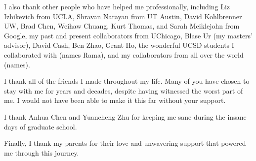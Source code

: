 \documentclass[12pt]{ucsddissertation}
\begin{document}
\begin{acknowledgements}
I also thank other people who have helped me professionally, including Liz Izhikevich from UCLA, Shravan Narayan from UT Austin, David Kohlbrenner UW, Brad Chen, Weihaw Chuang, Kurt Thomas, and Sarah Meiklejohn from Google, my past and present collaborators from UChicago, Blase Ur (my masters' advisor), David Cash, Ben Zhao, Grant Ho, the wonderful UCSD students I collaborated with (names Rama), and my collaborators from all over the world (names).

I thank all of the friends I made throughout my life. Many of you have chosen to stay with me for years and decades, despite having witnessed the worst part of me. I would not have been able to make it this far without your support. 

I thank Anhua Chen and Yuancheng Zhu for keeping me sane during the insane days of graduate school.

Finally, I thank my parents for their love and unwavering support that powered me through this journey.



\end{acknowledgements}
\end{document}
